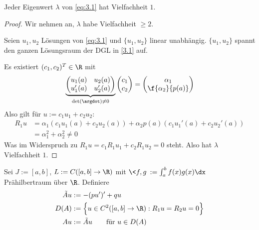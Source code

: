 \begin{st} \label{3.8}
	Jeder Eigenwert $\lambda$ von \eqref{eq:3.1} hat Vielfachheit $1$.
	\begin{proof}
		Wir nehmen an, $\lambda$ habe Vielfachheit $\ge 2$.

		Seien $u_1, u_2$ Lösungen von \eqref{eq:3.1} und $\{u_1,u_2\}$ linear unabhängig.
		$\{u_1,u_2\}$ spannt den ganzen Lösungsraum der DGL in \eqref{3.1} auf.

		Es existiert $(c_1,c_2)^T \in \R$ mit
		\[
			\underbrace{\begin{pmatrix}
				u_1(a) & u_2(a) \\
				u_1'(a) & u_2'(a)
			\end{pmatrix}}_{\det(\argdot) \neq 0}
			\begin{pmatrix}
				c_1 \\ c_2
			\end{pmatrix}
			= \begin{pmatrix}
				\alpha_1 \\ \f{\alpha_2}{p(a)}
			\end{pmatrix}
		\]
		Also gilt für $u:= c_1u_1 + c_2 u_2$:
		\begin{align*}
			R_1 u &= \alpha_1(c_1u_1(a) + c_2u_2(a)) + \alpha_2 p(a) (c_1u_1'(a) + c_2u_2'(a)) \\
			&= \alpha_1^2 + \alpha_2^2
			\neq 0
		\end{align*}
		Was im Widerspruch zu $R_1u = c_1R_1u_1 + c_2R_1u_2 = 0$ steht.
		Also hat $\lambda$ Vielfachheit $1$.
	\end{proof}
\end{st}

\begin{df} \label{3.9}
	Sei $J := [a,b]$, $L := C([a,b] \to \R)$ mit $\<f,g\> := \int_a^b f(x)g(x) \dx$ Prähilbertraum über $\R$.
	Definiere
	\begin{align}
		\label{eq:3.2}
		\begin{aligned}
			\tilde A u &:= -(pu')' + qu \\
			D(A) &:= \Big\{ u \in C^2([a,b] \to \R) : R_1u = R_2u = 0 \Big\} \\
			Au &:= \tilde A u \qquad \text{für $u\in D(A)$}
		\end{aligned}
	\end{align}
\end{df}

